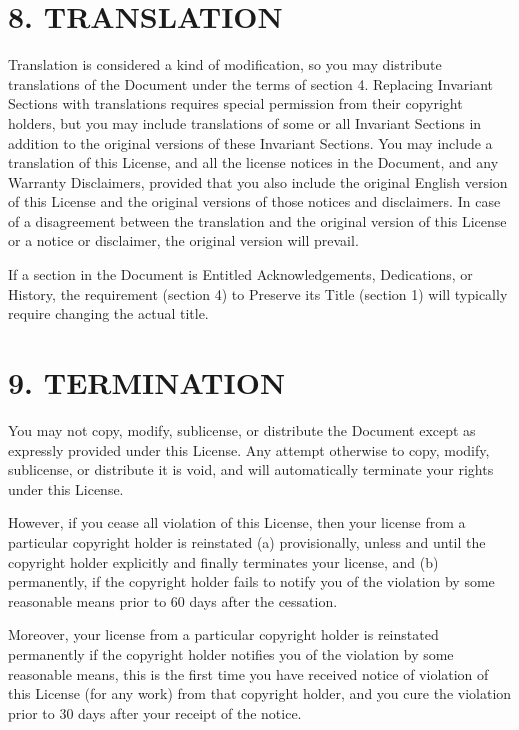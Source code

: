 \documentclass[captions=tableheading]{scrbook}
\begin{document}
\section{8. TRANSLATION}
\label{sec-18-9}


Translation is considered a kind of modification, so you may distribute translations of the Document under the terms of section 4. Replacing Invariant Sections with translations requires special permission from their copyright holders, but you may include translations of some or all Invariant Sections in addition to the original versions of these Invariant Sections. You may include a translation of this License, and all the license notices in the Document, and any Warranty Disclaimers, provided that you also include the original English version of this License and the original versions of those notices and disclaimers. In case of a disagreement between the translation and the original version of this License or a notice or disclaimer, the original version will prevail.

If a section in the Document is Entitled Acknowledgements, Dedications, or History, the requirement (section 4) to Preserve its Title (section 1) will typically require changing the actual title.
\section{9. TERMINATION}
\label{sec-18-10}


You may not copy, modify, sublicense, or distribute the Document except as expressly provided under this License. Any attempt otherwise to copy, modify, sublicense, or distribute it is void, and will automatically terminate your rights under this License.

However, if you cease all violation of this License, then your license from a particular copyright holder is reinstated (a) provisionally, unless and until the copyright holder explicitly and finally terminates your license, and (b) permanently, if the copyright holder fails to notify you of the violation by some reasonable means prior to 60 days after the cessation.

Moreover, your license from a particular copyright holder is reinstated permanently if the copyright holder notifies you of the violation by some reasonable means, this is the first time you have received notice of violation of this License (for any work) from that copyright holder, and you cure the violation prior to 30 days after your receipt of the notice. 
\end{document}
